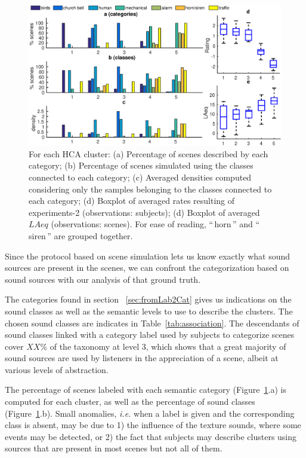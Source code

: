 \documentclass[twoside,twocolumn]{article}
\begin{document}
\begin{figure}[t!]
\centering
\includegraphics[width=.8\paperwidth]{gfxMatlab/xp3_2.eps} 
\caption{\label{fig:xp3_2} For each HCA cluster: (a) Percentage of scenes described by each category; (b) Percentage of scenes simulated using the classes connected to each category; (c) Averaged densities computed considering only the samples belonging to the classes connected to each category; (d) Boxplot of averaged rates resulting of experiments-2 (observations: subjects); (d) Boxplot of averaged $LAeq$ (observations: scenes). For ease of reading, ``\,horn\,'' and ``\,siren\,'' are grouped together.}
\end{figure}

Since the protocol based on scene simulation lets us know exactly what sound sources are present in the scenes, we can confront the categorization based on sound sources with our analysis of that ground truth.

The categories found in section ~\ref{sec:fromLab2Cat} gives us indications on the sound classes as well as the semantic levels to use to describe the clusters. The chosen sound classes are indicates in Table~\ref{tab:association}.  The descendants of sound classes linked with a category label used by subjects to categorize scenes cover $XX\%$ of the taxonomy at level 3, which shows that a great majority of sound sources are used by listeners in the appreciation of a scene, albeit at various levels of abstraction.


The percentage of scenes labeled with each semantic category (Figure~\ref{fig:xp3_2}.a) is computed for each cluster, as well as the percentage of sound classes (Figure~\ref{fig:xp3_2}.b). Small anomalies, \textit{i.e.} when a label is given and the corresponding class is absent, may be due to 1) the influence of the texture sounds, where some events may be detected, or 2) the fact that subjects may describe clusters using sources that are present in most scenes but not all of them. 
 
\end{document}
